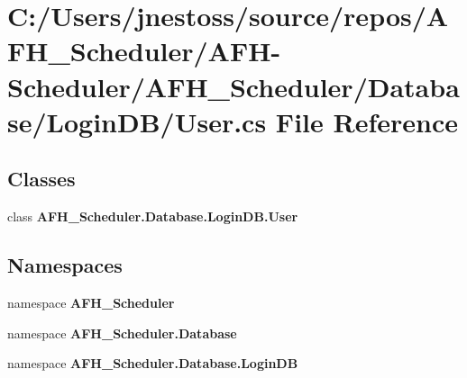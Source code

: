 \section{C\+:/\+Users/jnestoss/source/repos/\+A\+F\+H\+\_\+\+Scheduler/\+A\+F\+H-\/\+Scheduler/\+A\+F\+H\+\_\+\+Scheduler/\+Database/\+Login\+D\+B/\+User.cs File Reference}
\label{_user_8cs}
\subsection*{Classes}
\begin{DoxyCompactItemize}
\item 
class \textbf{ A\+F\+H\+\_\+\+Scheduler.\+Database.\+Login\+D\+B.\+User}
\end{DoxyCompactItemize}
\subsection*{Namespaces}
\begin{DoxyCompactItemize}
\item 
namespace \textbf{ A\+F\+H\+\_\+\+Scheduler}
\item 
namespace \textbf{ A\+F\+H\+\_\+\+Scheduler.\+Database}
\item 
namespace \textbf{ A\+F\+H\+\_\+\+Scheduler.\+Database.\+Login\+DB}
\end{DoxyCompactItemize}
